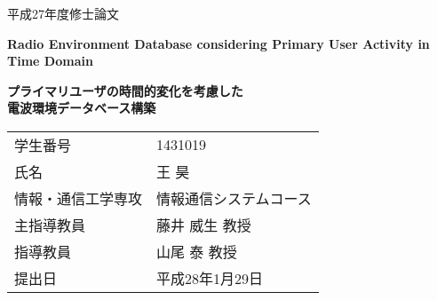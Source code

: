 \documentclass[a4paper,11pt,openany]{book}
\begin{document}
\begin{center}
  \vspace*{20mm}

  {\LARGE 平成27年度修士論文\\}

  \vspace{10mm}

  {\huge\bf Radio Environment Database considering Primary User Activity in Time Domain\\}

  \vspace{5mm}

  {\huge\bf プライマリユーザの時間的変化を考慮した\\電波環境データベース構築\\}

  \vspace{10mm}

  \begin{table}[h]
    \LARGE
    \begin{center}
      \begin{tabular}{ll}
        学生番号 & 1431019\\
        氏名 & 王 昊\\
        情報・通信工学専攻  & 情報通信システムコース\\
        主指導教員 & 藤井 威生 教授\\
        指導教員 & 山尾 泰 教授\\
        提出日 & 平成28年1月29日\\
      \end{tabular}
    \end{center}
  \end{table}
  
\end{center}
\end{document}
